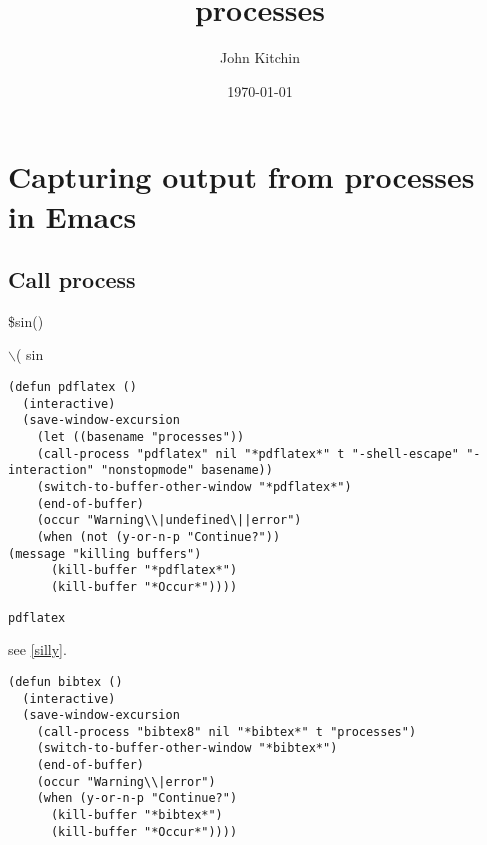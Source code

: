 \documentclass[11pt]{article}
\author{John Kitchin}
\date{\today}
\title{processes}
\begin{document}
\tableofcontents

\section{Capturing output from processes in Emacs}
\label{sec-1}


\cite{aarik-1997-effec-tio2}

\subsection{Call process}
\label{sec-1-1}

\$sin()

$\backslash$( sin

\begin{verbatim}
(defun pdflatex ()
  (interactive)
  (save-window-excursion
    (let ((basename "processes"))
    (call-process "pdflatex" nil "*pdflatex*" t "-shell-escape" "-interaction" "nonstopmode" basename)) 
    (switch-to-buffer-other-window "*pdflatex*")
    (end-of-buffer)
    (occur "Warning\\|undefined\||error")
    (when (not (y-or-n-p "Continue?"))
(message "killing buffers") 
      (kill-buffer "*pdflatex*") 
      (kill-buffer "*Occur*"))))
\end{verbatim}

\begin{verbatim}
pdflatex
\end{verbatim}

see \ref{silly}.

\begin{verbatim}
(defun bibtex ()
  (interactive)
  (save-window-excursion
    (call-process "bibtex8" nil "*bibtex*" t "processes") 
    (switch-to-buffer-other-window "*bibtex*")
    (end-of-buffer)
    (occur "Warning\\|error")
    (when (y-or-n-p "Continue?") 
      (kill-buffer "*bibtex*") 
      (kill-buffer "*Occur*"))))
\end{verbatim}



\cite{bad-citation}



\end{document}
